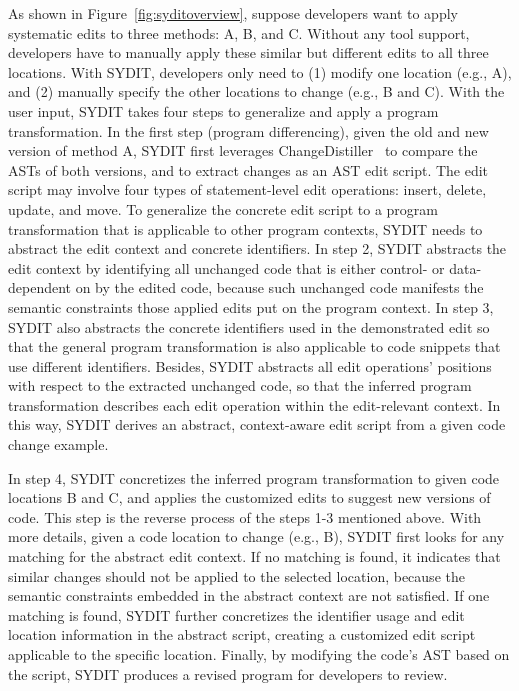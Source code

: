 \documentclass[runningheads,a4paper]{llncs}
\begin{document}
As shown in Figure~\ref{fig:syditoverview}, suppose developers want to apply systematic edits to three methods: A, B, and C. Without any tool support, developers have to manually apply these similar but different edits to all three locations. With SYDIT, developers only need to (1) modify one location (e.g., A), and (2) manually specify the other locations to change (e.g., B and C). With the user input, SYDIT takes four steps to generalize and apply a program transformation. In the first step (program differencing), given the old and new version of method A, SYDIT first leverages ChangeDistiller~\cite{FWP2007} to compare the ASTs of both versions, and to extract changes as an AST edit script. The edit script may involve four types of statement-level edit operations: insert, delete, update, and move. To generalize the concrete edit script to a program transformation that is applicable to other program contexts, SYDIT needs to abstract the edit context and concrete identifiers. In step 2, SYDIT abstracts the edit context by identifying all unchanged code that is either control- or data-dependent on by the edited code, because such unchanged code manifests the semantic constraints those applied edits put on the program context. In step 3, SYDIT also abstracts the concrete identifiers used in the demonstrated edit so that the general program transformation is also applicable to code snippets that use different identifiers. Besides, SYDIT abstracts all edit operations' positions with respect to the extracted unchanged code, so that the inferred program transformation describes each edit operation within the edit-relevant context.
In this way, SYDIT derives an abstract, context-aware edit script from a given code change example.

In step 4, SYDIT concretizes the inferred program transformation to given code locations B and C, and applies the customized edits to suggest new versions of code. This step is the reverse process of the steps 1-3 mentioned above. With more details, given a code location to change (e.g., B), SYDIT first looks for any matching for the abstract edit context. If no matching is found, it indicates that similar changes should not be applied to the selected location, because the semantic constraints embedded in the abstract context are not satisfied. If one matching is found, SYDIT further concretizes the identifier usage and edit location information in the abstract script, creating a customized edit script applicable to the specific location. Finally, by modifying the code's AST based on the script, SYDIT produces a revised program for developers to review.
\end{document}
